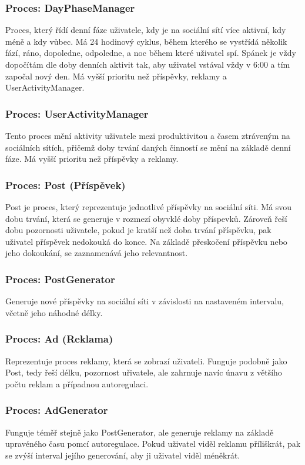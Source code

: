 \documentclass[11pt, a4paper]{article}
\begin{document}
\subsubsection{Proces: DayPhaseManager}
Proces, který řídí denní fáze uživatele, kdy je na sociální sítí více aktivní, kdy méně a kdy vůbec. 
Má 24 hodinový cyklus, během kterého se vystřídá několik fází, ráno, dopoledne, odpoledne, a noc během které uživatel spí.
Spánek je vždy dopočítám dle doby denních aktivit tak, aby uživatel vstával vždy v 6:00 a tím započal nový den.
Má vyšší prioritu než příspěvky, reklamy a UserActivityManager.
\subsubsection{Proces: UserActivityManager}
Tento proces mění aktivity uživatele mezi produktivitou a časem ztráveným na sociálních sítích, přičemž doby trvání daných činností se mění na základě denní fáze.
Má vyšší prioritu než příspěvky a reklamy. 
\subsubsection{Proces: Post (Příspěvek)}
Post je proces, který reprezentuje jednotlivé příspěvky na sociální síti. Má svou dobu trvání, která se generuje v rozmezí obyvklé doby příspevků.
Zároveň řeší dobu pozornosti uživatele, pokud je kratší než doba trvání příspěvku, pak uživatel příspěvek nedokouká do konce.
Na základě přeskočení příspěvku nebo jeho dokoukání, se zaznamenává jeho relevantnost.
\subsubsection{Proces: PostGenerator}
Generuje nové příspěvky na sociální síti v závislosti na nastaveném intervalu, včetně jeho náhodné délky.
\subsubsection{Proces: Ad (Reklama)}
Reprezentuje proces reklamy, která se zobrazí uživateli. Funguje podobně jako Post, tedy řeší délku, pozornost uřivatele, ale zahrnuje navíc únavu z většího počtu reklam a případnou autoregulaci.
\subsubsection{Proces: AdGenerator}
Funguje téměř stejně jako PostGenerator, ale generuje reklamy na základě upravéného času pomcí autoregulace. Pokud uživatel viděl reklamu příliškrát, pak se zvýší interval jejího generování, aby ji uživatel viděl méněkrát.
\end{document}
